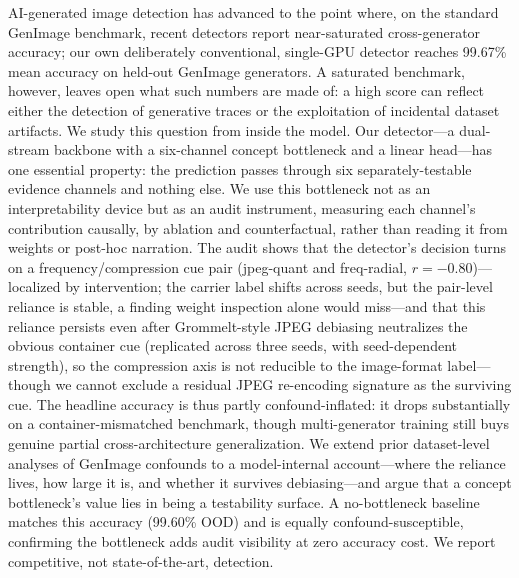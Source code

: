 AI-generated image detection has advanced to the point where, on the standard GenImage benchmark, recent detectors report near-saturated cross-generator accuracy; our own deliberately conventional, single-GPU detector reaches 99.67\% mean accuracy on held-out GenImage generators. A saturated benchmark, however, leaves open what such numbers are made of: a high score can reflect either the detection of generative traces or the exploitation of incidental dataset artifacts. We study this question from inside the model. Our detector---a dual-stream backbone with a six-channel concept bottleneck and a linear head---has one essential property: the prediction passes through six separately-testable evidence channels and nothing else. We use this bottleneck not as an interpretability device but as an audit instrument, measuring each channel's contribution causally, by ablation and counterfactual, rather than reading it from weights or post-hoc narration. The audit shows that the detector's decision turns on a frequency/compression cue pair (jpeg-quant and freq-radial, $r{=}{-}0.80$)---localized by intervention; the carrier label shifts across seeds, but the pair-level reliance is stable, a finding weight inspection alone would miss---and that this reliance persists even after Grommelt-style JPEG debiasing neutralizes the obvious container cue (replicated across three seeds, with seed-dependent strength), so the compression axis is not reducible to the image-format label---though we cannot exclude a residual JPEG re-encoding signature as the surviving cue. The headline accuracy is thus partly confound-inflated: it drops substantially on a container-mismatched benchmark, though multi-generator training still buys genuine partial cross-architecture generalization. We extend prior dataset-level analyses of GenImage confounds to a model-internal account---where the reliance lives, how large it is, and whether it survives debiasing---and argue that a concept bottleneck's value lies in being a testability surface. A no-bottleneck baseline matches this accuracy (99.60\% OOD) and is equally confound-susceptible, confirming the bottleneck adds audit visibility at zero accuracy cost. We report competitive, not state-of-the-art, detection.
